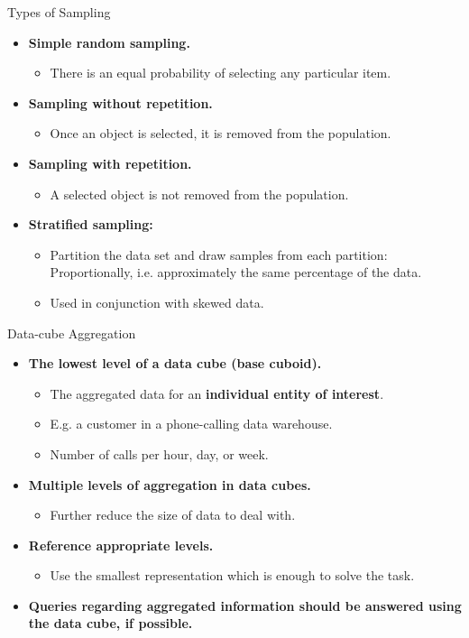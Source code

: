 \begin{frame}{Types of Sampling}
	\begin{itemize}
		\item \textbf{Simple random sampling.}
		\begin{itemize}
			\item There is an equal probability of selecting any particular 
			item.
		\end{itemize}
		\item \textbf{Sampling without repetition.}
		\begin{itemize}
			\item Once an object is selected, it is removed from the population.
		\end{itemize}
		\item \textbf{Sampling with repetition.}
		\begin{itemize}
			\item A selected object is not removed from the population.
		\end{itemize}
		\item \textbf{Stratified sampling:}
		\begin{itemize}
			\item Partition the data set and draw samples from each partition: 
			Proportionally, i.e. approximately the same percentage of the data.
			\item Used in conjunction with skewed data.
		\end{itemize}
	\end{itemize}
\end{frame}

\begin{frame}{Data-cube Aggregation}
	\begin{itemize}
		\item \textbf{The lowest level of a data cube (base cuboid).}
		\begin{itemize}
			\item The aggregated data for an \textbf{individual entity of 
			interest}.
			\item E.g. a customer in a phone-calling data warehouse.
			\item Number of calls per hour, day, or week.
		\end{itemize}
		\item \textbf{Multiple levels of aggregation in data cubes.}
		\begin{itemize}
			\item Further reduce the size of data to deal with.
		\end{itemize}
		\item \textbf{Reference appropriate levels.}
		\begin{itemize}
			\item Use the smallest representation which is enough to solve the 
			task.
		\end{itemize}
		\item \textbf{Queries regarding aggregated information should be 
		answered using the data cube, if possible.}
	\end{itemize}
\end{frame}

